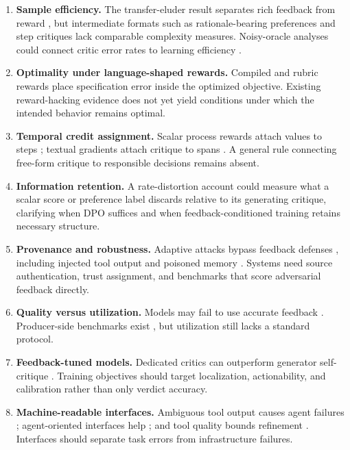 \begin{enumerate}[leftmargin=1.6em]
    \item \textbf{Sample efficiency.} The transfer-eluder result separates rich feedback from reward \citep{xu2025formalizing}, but intermediate formats such as rationale-bearing preferences and step critiques lack comparable complexity measures. Noisy-oracle analyses could connect critic error rates to learning efficiency \citep{strehl2009reinforcement,lin2024criticbench}.
    \item \textbf{Optimality under language-shaped rewards.} Compiled and rubric rewards place specification error inside the optimized objective. Existing reward-hacking evidence \citep{casper2023open} does not yet yield conditions under which the intended behavior remains optimal.
    \item \textbf{Temporal credit assignment.} Scalar process rewards attach values to steps \citep{lightman2024let}; textual gradients attach critique to spans \citep{wang2026text2gradreinforcementlearningnatural}. A general rule connecting free-form critique to responsible decisions remains absent.
    \item \textbf{Information retention.} A rate-distortion account could measure what a scalar score or preference label discards relative to its generating critique, clarifying when DPO \citep{rafailov2023direct} suffices and when feedback-conditioned training \citep{luo2025fcp} retains necessary structure.
    \item \textbf{Provenance and robustness.} Adaptive attacks bypass feedback defenses \citep{zhan2025adaptive}, including injected tool output \citep{shi2025prompt} and poisoned memory \citep{dong2026memory}. Systems need source authentication, trust assignment, and benchmarks that score adversarial feedback directly.
    \item \textbf{Quality versus utilization.} Models may fail to use accurate feedback \citep{jiang2025feedback}. Producer-side benchmarks exist \citep{lin2024criticbench,lambert2024rewardbench,zheng2024processbench}, but utilization still lacks a standard protocol.
    \item \textbf{Feedback-tuned models.} Dedicated critics can outperform generator self-critique \citep{wang2023shepherd,mcaleese2024criticgpt}. Training objectives should target localization, actionability, and calibration rather than only verdict accuracy.
    \item \textbf{Machine-readable interfaces.} Ambiguous tool output causes agent failures \citep{bandlamudi2025framework}; agent-oriented interfaces help \citep{yang2024swe}; and tool quality bounds refinement \citep{ning2026code}. Interfaces should separate task errors from infrastructure failures.

\end{enumerate}
